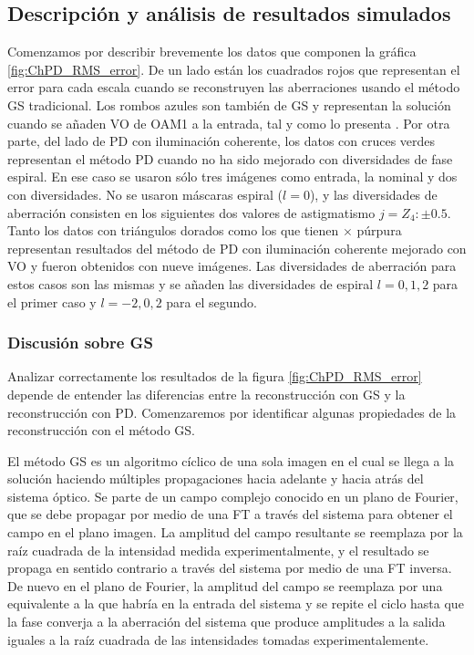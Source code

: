 \subsection{Descripción y análisis de resultados simulados}
Comenzamos por describir brevemente los datos que componen la gráfica
\ref{fig:ChPD_RMS_error}. De un lado están los cuadrados rojos que representan el error
para cada escala cuando se reconstruyen las aberraciones usando el
método GS tradicional. Los rombos azules son también de GS y
representan la solución cuando se añaden VO de OAM1 a la entrada, tal
y como lo presenta . Por otra parte, del lado
de PD con iluminación coherente, los datos con cruces verdes
representan el método PD cuando no ha sido mejorado con
diversidades de fase espiral.
En ese caso se usaron sólo tres imágenes como entrada, la nominal y
dos con diversidades. No se usaron máscaras espiral ($l=0$), y las
diversidades de aberración consisten en los siguientes dos valores de
astigmatismo $j=Z_4:\pm 0.5$. Tanto los datos con triángulos dorados
como los que tienen  $\times$ púrpura representan resultados del
método de PD con iluminación coherente mejorado con VO y fueron
obtenidos con nueve imágenes. Las diversidades de aberración para
estos casos son las mismas y se añaden las diversidades de espiral
$l=0,1,2$ para el primer caso y $l=-2,0,2$ para el segundo.  

\subsubsection{Discusión sobre GS}
Analizar correctamente los resultados de la figura
\ref{fig:ChPD_RMS_error} depende de entender las diferencias entre la
reconstrucción con GS y la reconstrucción con PD. Comenzaremos por
identificar algunas propiedades de la reconstrucción con el método GS.

El método GS es un algoritmo cíclico de una sola imagen en el cual se
llega a la solución haciendo múltiples propagaciones hacia adelante y hacia atrás
del sistema óptico. Se parte de un campo complejo conocido en un plano
de Fourier, que se debe propagar por medio de una FT a través del
sistema para obtener el campo en el plano imagen. La amplitud del
campo resultante se reemplaza por la raíz cuadrada de la intensidad
medida experimentalmente, y el resultado se propaga en sentido
contrario a través del sistema por medio de una FT inversa. De nuevo
en el plano de Fourier, la amplitud del campo se reemplaza por una
equivalente a la que habría en la entrada del sistema y se repite el
ciclo hasta que la fase converja a la aberración del sistema que
produce amplitudes a la salida iguales a la raíz cuadrada de las
intensidades tomadas experimentalemente. 


